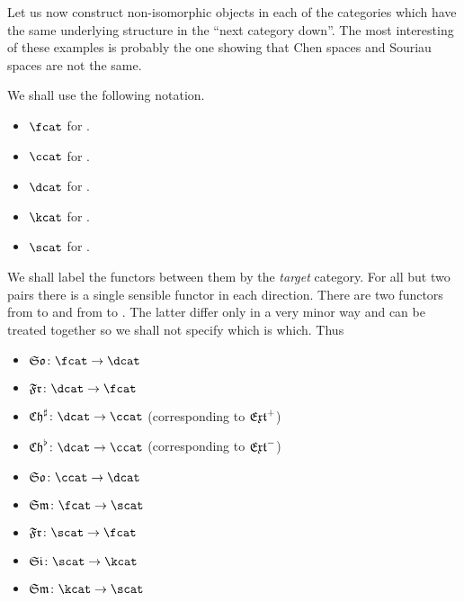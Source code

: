 \documentclass[%
12pt,%
arxiv,%
defaults
]{myclass}
\begin{document}
\medskip

Let us now construct non\hyp{}isomorphic objects in each of the categories which have the same underlying structure in the ``next category down''.
The most interesting of these examples is probably the one showing that Chen spaces and Souriau spaces are not the same.

We shall use the following notation.
%
\begin{itemize}
\item \(\fcat\) for \fcat.
\item \(\ccat\) for \ccat.
\item \(\dcat\) for \dcat.
\item \(\kcat\) for \kcat.
\item \(\scat\) for \scat.
\end{itemize}
%
We shall label the functors between them by the \emph{target} category.
For all but two pairs there is a single sensible functor in each direction.
There are two functors from \dcat to \ccat and from \fcat to \scat.
The latter differ only in a very minor way and can be treated together so we shall not specify which is which.
Thus
%
\begin{itemize}
\item \(\FrSo\colon \fcat \to \dcat\)
\item \(\SoFr\colon \dcat \to \fcat\)
\item \(\SoCht\colon \dcat \to \ccat\) (corresponding to \(\Jextfunc\))
\item \(\SoChb\colon \dcat \to \ccat\) (corresponding to \(\Mextfunc\))
\item \(\ChSo\colon \ccat \to \dcat\)
\item \(\FrSm\colon \fcat \to \scat\)
\item \(\SmFr\colon \scat \to \fcat\)
\item \(\SmSi\colon \scat \to \kcat\)
\item \(\SiSm\colon \kcat \to \scat\)
\end{itemize}
\end{document}
